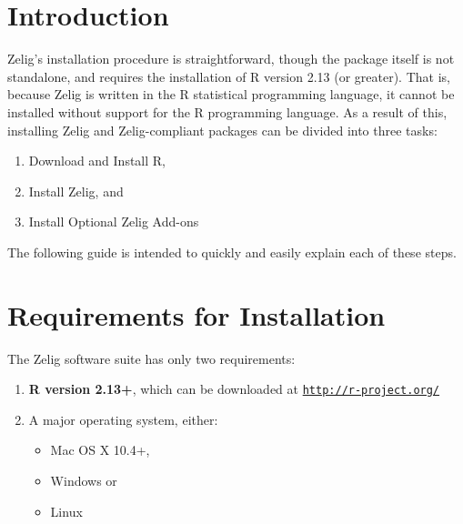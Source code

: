 
%
\newcommand{\CranMirror}[0]{
  \href{http://cran.opensourceresources.org/}{http://cran.opensourceresources.org/}
}

\newcommand{\InstallInstructionsHref}[0]{
  \href{http://cran.r-project.org/doc/manuals/R-admin.html}{http://cran.r-project.org/doc/manuals/R-admin.html}
}

\newcommand{\MacInstallHref}[0]{
\href{http://cran.r-project.org/doc/manuals/R-admin.html\#Installing-R-under-_0028Mac_0029-OS-X}{Mac}
}
\newcommand{\WindowsInstallHref}[0]{
\href{http://cran.r-project.org/doc/manuals/R-admin.html\#Installing-R-under-Windows}{Windows}
}
\newcommand{\UnixInstallHref}[0]{
\href{http://cran.r-project.org/doc/manuals/R-admin.html\#Installing-R-under-Unix_002dalikes}{Unix-alike}
}



\section{Introduction}

Zelig's installation procedure is straightforward, though the package itself is not standalone, and requires the installation of R version 2.13 (or greater). That is, because Zelig is written in the R statistical programming language, it cannot be installed without support for the R programming language. As a result of this, installing Zelig and Zelig-compliant packages can be divided into three tasks:

\begin{enumerate}
	\item Download and Install R,
	\item Install Zelig, and
	\item Install Optional Zelig Add-ons
\end{enumerate}

The following guide is intended to quickly and easily explain each of these steps.

%
%
\section{Requirements for Installation}

The Zelig software suite has only two requirements: 

\begin{enumerate}
	\item {\bf R version 2.13+}, which can be downloaded at \href{http://www.r-project.org/}{\tt http://r-project.org/}
	\item A major operating system, either:
		\begin{itemize}
			\item Mac OS X 10.4+,
			\item Windows or
			\item Linux
		\end{itemize}
\end{enumerate}

